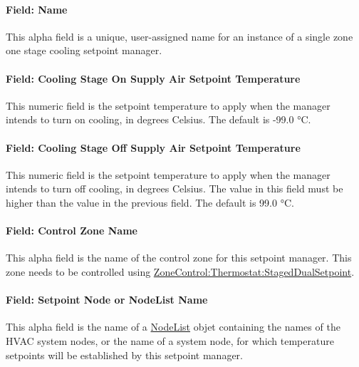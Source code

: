 \paragraph{Field: Name}\label{field-name-25-001}

This alpha field is a unique, user-assigned name for an instance of a single zone one stage cooling setpoint manager.

\paragraph{Field: Cooling Stage On Supply Air Setpoint Temperature}\label{field-cooling-stage-on-supply-air-setpoint-temperature}

This numeric field is the setpoint temperature to apply when the manager intends to turn on cooling, in degrees Celsius. The default is -99.0 °C.

\paragraph{Field: Cooling Stage Off Supply Air Setpoint Temperature}\label{field-cooling-stage-off-supply-air-setpoint-temperature}

This numeric field is the setpoint temperature to apply when the manager intends to turn off cooling, in degrees Celsius. The value in this field must be higher than the value in the previous field. The default is 99.0 °C.

\paragraph{Field: Control Zone Name}\label{field-control-zone-name-3}

This alpha field is the name of the control zone for this setpoint manager. This zone needs to be controlled using \hyperref[zonecontrolthermostatstageddualsetpoint]{ZoneControl:Thermostat:StagedDualSetpoint}.

\paragraph{Field: Setpoint Node or NodeList Name}\label{field-setpoint-node-or-nodelist-name-20}

This alpha field is the name of a \hyperref[nodelist]{NodeList} objet containing the names of the HVAC system nodes, or the name of a system node, for which temperature setpoints will be established by this setpoint manager.


